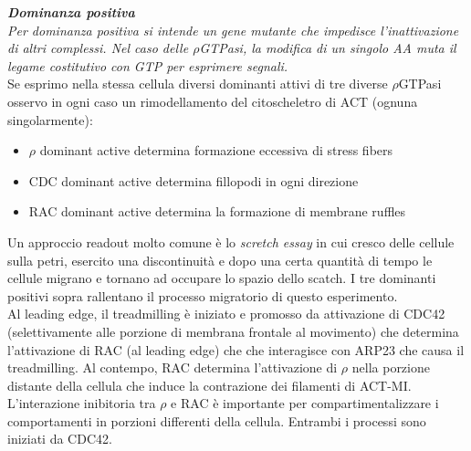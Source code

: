             \textit{    
                \textbf{Dominanza positiva} \\
                Per dominanza positiva si intende un gene mutante che impedisce l'inattivazione di altri complessi. Nel caso delle $\rho$GTPasi, la modifica di un singolo AA muta il legame costitutivo con GTP per esprimere segnali.}\\
            
            Se esprimo nella stessa cellula diversi dominanti attivi di tre diverse $\rho$GTPasi osservo in ogni caso un rimodellamento del citoscheletro di ACT (ognuna singolarmente):
            \begin{itemize}
                \item $\rho$ dominant active determina formazione eccessiva di stress fibers
                \item CDC dominant active determina fillopodi in ogni direzione
                \item RAC dominant active determina la formazione di membrane ruffles
            \end{itemize}
            Un approccio readout molto comune è lo \textit{scretch essay} in cui cresco delle cellule sulla petri, esercito una discontinuità e dopo una certa quantità di tempo le cellule migrano e tornano ad occupare lo spazio dello scatch. 
            I tre dominanti positivi sopra rallentano il processo migratorio di questo esperimento. \\
            Al leading edge, il treadmilling è iniziato e promosso da attivazione di CDC42 (selettivamente alle porzione di membrana frontale al movimento) che determina l'attivazione di RAC (al leading edge) che che interagisce con ARP23 che causa il treadmilling. Al contempo, RAC determina l'attivazione di $\rho$ nella porzione distante della cellula che induce la contrazione dei filamenti di ACT-MI.
            L'interazione inibitoria tra $\rho$ e RAC è importante per compartimentalizzare i comportamenti in porzioni differenti della cellula. Entrambi i processi sono iniziati da CDC42.

\pagebreak